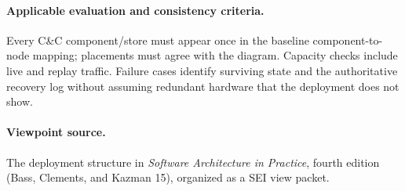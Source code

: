 \paragraph{Applicable evaluation and consistency criteria.}
Every C\&C
component/store must appear once in the baseline component-to-node mapping;
placements must agree with the diagram. Capacity checks include live and replay
traffic. Failure cases identify surviving state and the authoritative recovery
log without assuming redundant hardware that the deployment does not show.

\paragraph{Viewpoint source.}
The deployment structure in \emph{Software Architecture in Practice}, fourth
edition (Bass, Clements, and Kazman 15), organized as a SEI view packet.
